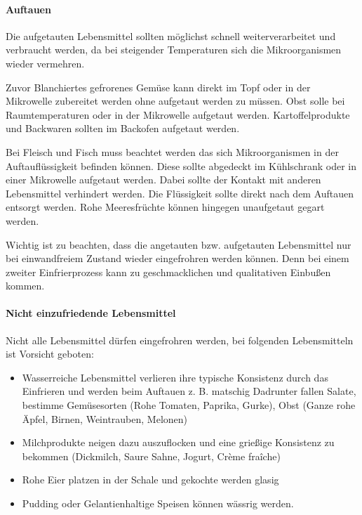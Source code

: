\paragraph{Auftauen}
Die aufgetauten Lebensmittel sollten möglichst schnell weiterverarbeitet und verbraucht werden, da bei steigender Temperaturen sich die Mikroorganismen wieder vermehren.

Zuvor Blanchiertes gefrorenes Gemüse kann direkt im Topf oder in der Mikrowelle zubereitet werden ohne aufgetaut werden zu müssen. Obst solle bei Raumtemperaturen oder in der Mikrowelle aufgetaut werden. Kartoffelprodukte und Backwaren sollten im Backofen aufgetaut werden.

Bei Fleisch und Fisch muss beachtet werden das sich Mikroorganismen in der Auftauflüssigkeit befinden können. Diese sollte abgedeckt im Kühlschrank oder in einer Mikrowelle aufgetaut werden. Dabei sollte der Kontakt mit anderen Lebensmittel verhindert werden. Die Flüssigkeit sollte direkt nach dem Auftauen entsorgt werden. Rohe Meeresfrüchte können hingegen unaufgetaut gegart werden.

Wichtig ist zu beachten, dass die angetauten bzw. aufgetauten Lebensmittel nur bei einwandfreiem Zustand wieder eingefrohren werden können. Denn bei einem zweiter Einfrierprozess kann zu geschmacklichen und qualitativen Einbußen kommen.\paragraph{Nicht einzufriedende Lebensmittel}
Nicht alle Lebensmittel dürfen eingefrohren werden, bei folgenden Lebensmitteln ist Vorsicht geboten: 
\begin{itemize}
  \item Wasserreiche Lebensmittel verlieren ihre typische Konsistenz durch das Einfrieren und werden beim Auftauen z. B. matschig Dadrunter fallen Salate, bestimme Gemüsesorten (Rohe Tomaten, Paprika, Gurke), Obst (Ganze rohe Äpfel, Birnen, Weintrauben, Melonen)
  \item Milchprodukte neigen dazu auszuflocken und eine grießige Konsistenz zu bekommen (Dickmilch, Saure Sahne, Jogurt, Crème fraîche)

  \item Rohe Eier platzen in der Schale und gekochte werden glasig

  \item Pudding oder Gelantienhaltige Speisen können wässrig werden.
\end{itemize}

